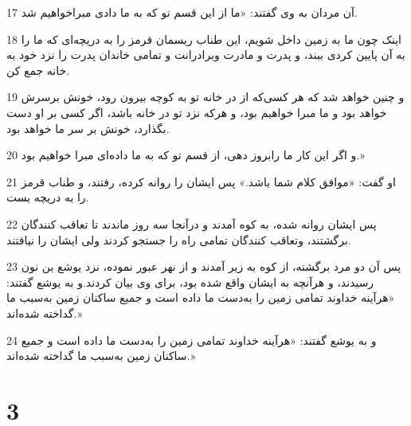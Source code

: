 \par 17 آن مردان به وی گفتند: «ما از این قسم تو که به ما دادی مبراخواهیم شد.
\par 18 اینک چون ما به زمین داخل شویم، این طناب ریسمان قرمز را به دریچه‌ای که ما را به آن پایین کردی ببند، و پدرت و مادرت وبرادرانت و تمامی خاندان پدرت را نزد خود به خانه جمع کن.
\par 19 و چنین خواهد شد که هر کسی‌که از در خانه تو به کوچه بیرون رود، خونش برسرش خواهد بود و ما مبرا خواهیم بود، و هر‌که نزد تو در خانه باشد، اگر کسی بر او دست بگذارد، خونش بر سر ما خواهد بود.
\par 20 و اگر این کار ما رابروز دهی، از قسم تو که به ما داده‌ای مبرا خواهیم بود.»
\par 21 او گفت: «موافق کلام شما باشد.» پس ایشان را روانه کرده، رفتند، و طناب قرمز را به دریچه بست.
\par 22 پس ایشان روانه شده، به کوه آمدند و درآنجا سه روز ماندند تا تعاقب کنندگان برگشتند، وتعاقب کنندگان تمامی راه را جستجو کردند ولی ایشان را نیافتند.
\par 23 پس آن دو مرد برگشته، از کوه به زیر آمدند و از نهر عبور نموده، نزد یوشع بن نون رسیدند، و هر‌آنچه به ایشان واقع شده بود، برای وی بیان کردند.و به یوشع گفتند: «هرآینه خداوند تمامی زمین را به‌دست ما داده است و جمیع ساکنان زمین به‌سبب ما گداخته شده‌اند.»
\par 24 و به یوشع گفتند: «هرآینه خداوند تمامی زمین را به‌دست ما داده است و جمیع ساکنان زمین به‌سبب ما گداخته شده‌اند.»
 
\chapter{3}

